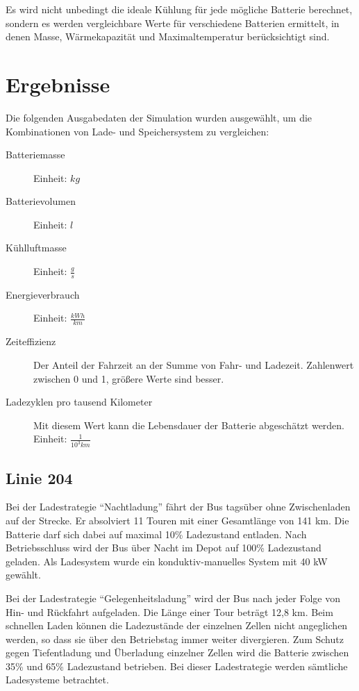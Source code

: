 Es wird nicht unbedingt die ideale Kühlung für jede mögliche Batterie berechnet, sondern es werden vergleichbare Werte für verschiedene Batterien ermittelt, in denen Masse, Wärmekapazität und Maximaltemperatur berücksichtigt sind.

\section{Ergebnisse}
\label{simErgebnisse}
Die folgenden Ausgabedaten der Simulation wurden ausgewählt, um die Kombinationen von Lade- und Speichersystem zu vergleichen:
\begin{description}
	\item[Batteriemasse] Einheit: $kg$
	\item[Batterievolumen] Einheit: $l$
	\item[Kühlluftmasse] Einheit: $\frac{g}{s}$
	\item[Energieverbrauch] Einheit: $\frac{kWh}{km}$
	\item[Zeiteffizienz] Der Anteil der Fahrzeit an der Summe von Fahr- und Ladezeit. Zahlenwert zwischen 0 und 1, größere Werte sind besser.
	\item[Ladezyklen pro tausend Kilometer] Mit diesem Wert kann die Lebensdauer der Batterie abgeschätzt werden.\\
	Einheit: $\frac{1}{10^{3}km}$  
\end{description}

\subsection{Linie 204}
\label{erkl204} 
Bei der Ladestrategie "`Nachtladung"' fährt der Bus tagsüber ohne Zwischenladen auf der Strecke. Er absolviert 11 Touren mit einer Gesamtlänge von 141 km. Die Batterie darf sich dabei auf maximal 10\% Ladezustand entladen. Nach Betriebsschluss wird der Bus über Nacht im Depot auf 100\% Ladezustand geladen. Als Ladesystem wurde ein konduktiv-manuelles System mit 40 kW gewählt.

Bei der Ladestrategie "`Gelegenheitsladung"' wird der Bus nach jeder Folge von Hin- und Rückfahrt aufgeladen. Die Länge einer Tour beträgt 12,8 km. Beim schnellen Laden können die Ladezustände der einzelnen Zellen nicht angeglichen werden, so dass sie über den Betriebstag immer weiter divergieren. Zum Schutz gegen Tiefentladung und Überladung einzelner Zellen wird die Batterie zwischen 35\% und 65\% Ladezustand betrieben. Bei dieser Ladestrategie werden sämtliche Ladesysteme betrachtet.

